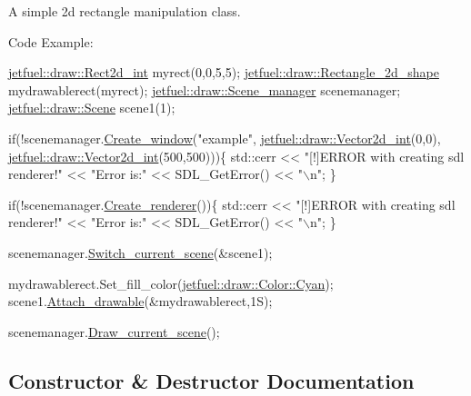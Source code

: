 A simple 2d rectangle manipulation class.

Code Example\+: 
\begin{DoxyCode}
\hyperlink{classjetfuel_1_1draw_1_1Rect2d}{jetfuel::draw::Rect2d\_int} myrect(0,0,5,5);
\hyperlink{classjetfuel_1_1draw_1_1Rectangle__2d__shape}{jetfuel::draw::Rectangle\_2d\_shape} mydrawablerect(myrect);
\hyperlink{classjetfuel_1_1draw_1_1Scene__manager}{jetfuel::draw::Scene\_manager} scenemanager;
\hyperlink{classjetfuel_1_1draw_1_1Scene}{jetfuel::draw::Scene} scene1(1);

\textcolor{keywordflow}{if}(!scenemanager.\hyperlink{classjetfuel_1_1draw_1_1Scene__manager_a5113e9062c272a22d383ba872417ba31}{Create\_window}(\textcolor{stringliteral}{"example"},
                         \hyperlink{classjetfuel_1_1draw_1_1Vector2d}{jetfuel::draw::Vector2d\_int}(0,0),
                         \hyperlink{classjetfuel_1_1draw_1_1Vector2d}{jetfuel::draw::Vector2d\_int}(500,500)))\{
   std::cerr << \textcolor{stringliteral}{"[!]ERROR with creating sdl renderer!"} <<
   \textcolor{stringliteral}{"Error is:"} << SDL\_GetError() << \textcolor{stringliteral}{"\(\backslash\)n"};
\}

  \textcolor{keywordflow}{if}(!scenemanager.\hyperlink{classjetfuel_1_1draw_1_1Scene__manager_afafecd926ce5e4b2543a6d583a7d24b6}{Create\_renderer}())\{
       std::cerr << \textcolor{stringliteral}{"[!]ERROR with creating sdl renderer!"} <<
      \textcolor{stringliteral}{"Error is:"} << SDL\_GetError() << \textcolor{stringliteral}{"\(\backslash\)n"};
  \}

scenemanager.\hyperlink{classjetfuel_1_1draw_1_1Scene__manager_a770c163b88ba8427539ee182315ea989}{Switch\_current\_scene}(&scene1);

mydrawablerect.Set\_fill\_color(\hyperlink{classjetfuel_1_1draw_1_1Color_a9c9781b9377310494e8af2a5fe524ab4}{jetfuel::draw::Color::Cyan});
scene1.\hyperlink{classjetfuel_1_1draw_1_1Scene_aea4b4c4ae25c30d661be4c52787e0ea3}{Attach\_drawable}(&mydrawablerect,1S);

scenemanager.\hyperlink{classjetfuel_1_1draw_1_1Scene__manager_a8af9a3abfd5121b1b8556342de435773}{Draw\_current\_scene}();
\end{DoxyCode}
 

\subsection{Constructor \& Destructor Documentation}
\mbox{\label{classjetfuel_1_1draw_1_1Rect2d_af5a9c18dea4e196ec326f31ab63ad644}} 
